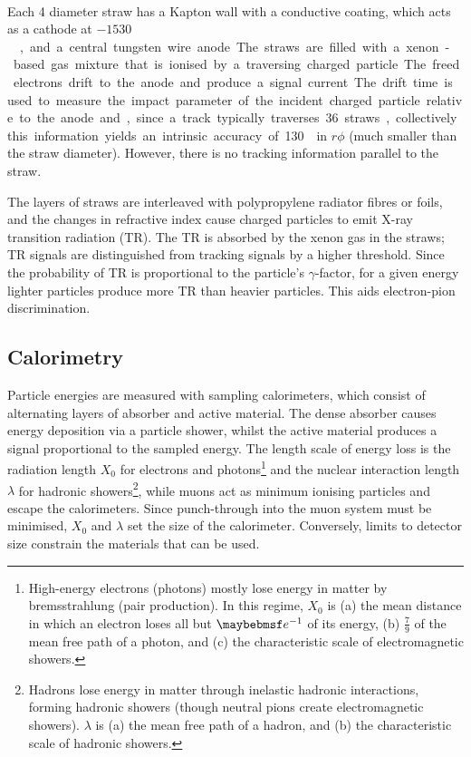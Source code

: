 \begin{description}
	Each \unit{4}{\milli\metre} diameter straw has a 
	Kapton\textsuperscript{\circledR}\xspace wall with a conductive coating, which 
	acts as a cathode at \unit{$-1530$}{\volt}, and a central tungsten wire anode. The 
	straws are filled with a xenon-based gas mixture that is ionised by a traversing 
	charged particle. The freed electrons drift to the anode and produce a signal current.
	The drift time is used to measure the impact parameter of the incident charged 
	particle relative to the anode and, since a track typically traverses 36 straws, 
	collectively this information yields an intrinsic accuracy of \unit{130}{\micro\metre}
	in $r\phi$ (much smaller than the straw diameter). However, there is no tracking 
	information parallel to the straw.

	The layers of straws are interleaved with polypropylene radiator fibres or foils, and 
	the changes in refractive index cause charged particles to emit X-ray transition 
	radiation (TR). The TR is absorbed by the xenon gas in the straws; TR signals are 
	distinguished from tracking signals by a higher threshold. Since the probability of 
	TR is proportional to the particle's $\gamma$-factor, for a given energy lighter 
	particles produce more TR than heavier particles. This aids electron-pion 
	discrimination.
\end{description}



\subsection{Calorimetry}
\label{sec:atlas:calo}

Particle energies are measured with sampling calorimeters, which consist of alternating 
layers of absorber and active material. The dense absorber causes energy deposition 
via a particle shower, whilst the active material produces a signal proportional to the 
sampled energy. The length scale of energy loss is the radiation length $X_0$ for 
electrons and photons\footnote{
	High-energy electrons (photons) mostly lose energy in matter by bremsstrahlung 
	(\epluseminus pair production). In this regime, $X_0$ is (a) the mean distance in 
	which an electron loses all but $\eexp{-1}$ of its energy, (b) $\tfrac{7}{9}$ of the 
	mean free path of a photon, and (c) the characteristic scale of electromagnetic 
	showers.
} and the nuclear interaction length $\lambda$ for hadronic showers\footnote{
	Hadrons lose energy in matter through inelastic hadronic interactions, forming hadronic showers (though neutral pions create electromagnetic showers). $\lambda$ is 
	(a) the mean free path of a hadron, and (b) the characteristic scale of hadronic showers.
}, while muons act as minimum ionising particles and escape the calorimeters. Since 
punch-through into the muon system must be minimised, $X_0$ and $\lambda$ set the size of 
the calorimeter. Conversely, limits to detector size constrain the materials that can be
used.

